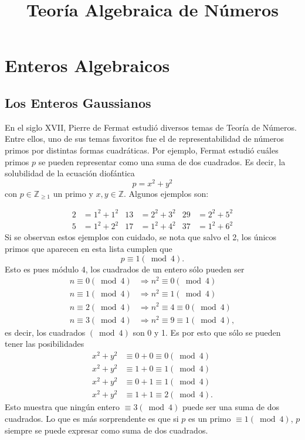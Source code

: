 \documentclass{amsbook}
\title{Teoría Algebraica de Números}
\renewcommand{\.}{\cdot}
\renewcommand{\:}{\colon}               %
\newcommand{\To}{\Rightarrow}
\theoremstyle{plain}
\theoremstyle{definition}
\theoremstyle{remark}
\numberwithin{equation}{section}
\begin{document}
\maketitle

\tableofcontents

\chapter{Enteros Algebraicos}

\section{Los Enteros Gaussianos}

En el siglo XVII, Pierre de Fermat estudió diversos temas de Teoría de Números. Entre ellos, uno de sus temas favoritos fue el de representabilidad de números primos por distintas formas cuadráticas. Por ejemplo, Fermat estudió cuáles primos $p$ se pueden representar como una suma de dos cuadrados. Es decir, la solubilidad de la ecuación diofántica
$$p=x^2+y^2$$
con $p\in\mathbb{Z}_{\geq 1}$ un primo y $x,y\in\mathbb{Z}$. Algunos ejemplos son:

\begin{align*}
    2&=1^2+1^2 &13&=2^2+3^2&29&=2^2+5^2\\
    5&=1^2+2^2 &17&=1^2+4^2&37&=1^2+6^2
\end{align*}
Si se observan estos ejemplos con cuidado, se nota que salvo el 2, los únicos primos que aparecen en esta lista 
cumplen que 
$$p\equiv 1(\bmod 4).$$ 
Esto es pues módulo 4, los cuadrados de un entero sólo pueden ser %
\begin{align*}
    n\equiv 0 (\bmod 4)&\To n^2\equiv 0(\bmod 4)\\
    n\equiv 1 (\bmod 4)&\To n^2\equiv 1(\bmod 4)\\
    n\equiv 2 (\bmod 4)&\To n^2\equiv 4\equiv 0(\bmod 4)\\
    n\equiv 3 (\bmod 4)&\To n^2\equiv 9\equiv 1(\bmod 4),
\end{align*}
es decir, los cuadrados $(\bmod 4)$ son 0 y 1. Es por esto que sólo se pueden tener las posibilidades 
\begin{align*}
    x^2+y^2&\equiv 0+0\equiv 0(\bmod 4)\\
    x^2+y^2&\equiv 1+0\equiv 1(\bmod 4)\\
    x^2+y^2&\equiv 0+1\equiv 1(\bmod 4)\\
    x^2+y^2&\equiv 1+1\equiv 2(\bmod 4).
\end{align*}
Esto muestra que ningún entero $\equiv 3(\bmod 4)$ puede ser una suma de dos cuadrados. Lo que es más sorprendente es que si $p$ es un primo $\equiv 1 (\bmod 4)$, $p$ siempre se puede expresar como suma de dos cuadrados.
\end{document}
